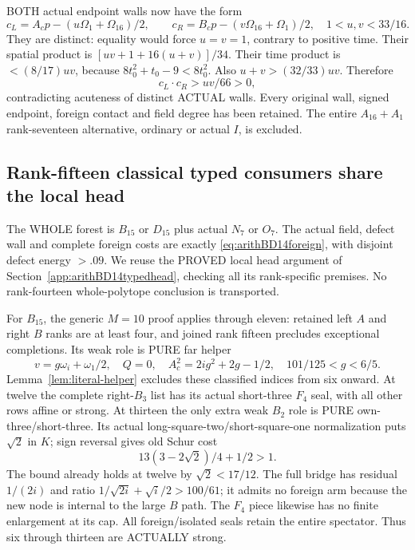 BOTH actual endpoint walls now have the form
\[
 c_L=A_cp-(u\Omega_1+\Omega_{16})/2,\qquad
 c_R=B_cp-(v\Omega_{16}+\Omega_1)/2,
                \quad1<u,v<33/16 .
\]
They are distinct: equality would force
\(u=v=1\), contrary to positive time.
Their spatial product is
\([uv+1+16(u+v)]/34\).
Their time product is \(<(8/17)uv\),
because \(8t_0^2+t_0-9<8t_0^2\).
Also \(u+v>(32/33)uv\).
Therefore
\[
                           c_L\cdot c_R>uv/66>0 ,
\]
contradicting acuteness of distinct ACTUAL
walls.
Every original wall, signed endpoint,
foreign contact and field degree has
been retained.
The entire \(A_{16}+A_1\) rank-seventeen
alternative, ordinary or actual \(I\),
is excluded.

\subsection{Rank-fifteen classical typed consumers share the local head}
\label{app:arithBD15typed}

The WHOLE forest is \(B_{15}\) or \(D_{15}\)
plus actual \(N_7\) or \(O_7\).
The actual field, defect wall and complete
foreign costs are exactly
\eqref{eq:arithBD14foreign}, with disjoint
defect energy \(>.09\).
We reuse the PROVED local head argument
of Section~\ref{app:arithBD14typedhead},
checking all its rank-specific premises.
No rank-fourteen whole-polytope conclusion
is transported.

For \(B_{15}\), the generic \(M=10\)
proof applies through eleven: retained left
\(A\) and right \(B\) ranks are at least
four, and joined rank fifteen precludes
exceptional completions.
Its weak role is PURE far helper
\[
 v=g\omega_i+\omega_1/2,\quad Q=0,\quad
 A_c^2=2ig^2+2g-1/2,\quad101/125<g<6/5 .
\]
Lemma~\ref{lem:literal-helper} excludes
these classified indices from six onward.
At twelve the complete right-\(B_3\)
list has its actual short-three \(F_4\)
seal, with all other rows affine or strong.
At thirteen the only extra weak \(B_2\)
role is PURE own-three/short-three.
Its actual long-square-two/short-square-one
normalization puts \(\sqrt2\) in \(K\);
sign reversal gives old Schur cost
\[
                    13(3-2\sqrt2)/4+1/2>1 .
\]
The bound already holds at twelve by
\(\sqrt2<17/12\).
The full bridge has residual \(1/(2i)\)
and ratio \(1/\sqrt{2i}+\sqrt i/2>100/61\);
it admits no foreign arm because the new
node is internal to the large \(B\) path.
The \(F_4\) piece likewise has no finite
enlargement at its cap.
All foreign/isolated seals retain the
entire spectator.
Thus six through thirteen are ACTUALLY
strong.


